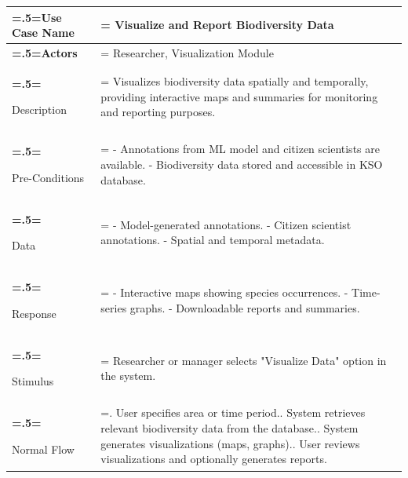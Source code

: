                 \begin{table}[H] 
                    \centering
                    \small
                    \begin{tabularx}{\textwidth}{|>{\bfseries\hsize=.5\hsize\linewidth=\hsize}X|
                    >{\hsize=1.5\hsize\linewidth=\hsize}X|}
                    \hline
                    Use Case Name       & Visualize and Report Biodiversity Data \\ \hline
                    
                    Actors              & 
                    Researcher, Visualization Module \\ \hline
                    
                    Description         & 
                    Visualizes biodiversity data spatially and temporally, providing interactive maps and summaries for monitoring and reporting purposes. \\ \hline
                    
                    Pre-Conditions      & 
                    - Annotations from ML model and citizen scientists are available.\newline
                    - Biodiversity data stored and accessible in KSO database. \\ \hline
                    
                    Data                & 
                    - Model-generated annotations.\newline
                    - Citizen scientist annotations.\newline
                    - Spatial and temporal metadata.  \\ \hline
                    
                    Response            & 
                    - Interactive maps showing species occurrences.\newline
                    - Time-series graphs.\newline
                    - Downloadable reports and summaries. \\ \hline
                    
                    Stimulus            & 
                    Researcher or manager selects "Visualize Data" option in the system. \\ \hline
                    
                    Normal Flow         & 
                    1. User specifies area or time period.\newline
                    2. System retrieves relevant biodiversity data from the database.\newline
                    3. System generates visualizations (maps, graphs).\newline
                    4. User reviews visualizations and optionally generates reports.  \\ \hline
                    

\end{tabularx}
\end{table}
